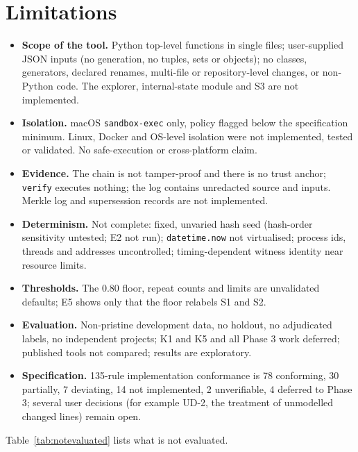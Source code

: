 \section{Limitations}\label{sec:limitations}
\begin{itemize}
\item \textbf{Scope of the tool.} Python top-level functions in single files; user-supplied JSON inputs (no generation, no tuples, sets or objects); no classes, generators, declared renames, multi-file or repository-level changes, or non-Python code. The explorer, internal-state module and S3 are not implemented.
\item \textbf{Isolation.} macOS \texttt{sandbox-exec} only, policy flagged below the specification minimum. Linux, Docker and OS-level isolation were not implemented, tested or validated. No safe-execution or cross-platform claim.
\item \textbf{Evidence.} The chain is not tamper-proof and there is no trust anchor; \texttt{verify} executes nothing; the log contains unredacted source and inputs. Merkle log and supersession records are not implemented.
\item \textbf{Determinism.} Not complete: fixed, unvaried hash seed (hash-order sensitivity untested; E2 not run); \texttt{datetime.now} not virtualised; process ids, threads and addresses uncontrolled; timing-dependent witness identity near resource limits.
\item \textbf{Thresholds.} The 0.80 floor, repeat counts and limits are unvalidated defaults; E5 shows only that the floor relabels S1 and S2.
\item \textbf{Evaluation.} Non-pristine development data, no holdout, no adjudicated labels, no independent projects; K1 and K5 and all Phase 3 work deferred; published tools not compared; results are exploratory.
\item \textbf{Specification.} 135-rule implementation conformance is 78 conforming, 30 partially, 7 deviating, 14 not implemented, 2 unverifiable, 4 deferred to Phase 3; several user decisions (for example UD-2, the treatment of unmodelled changed lines) remain open.
\end{itemize}
Table~\ref{tab:notevaluated} lists what is not evaluated.
